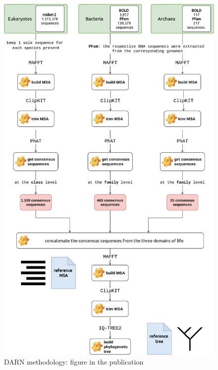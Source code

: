 \begin{figure}[!htbp]
   \centering
   \includegraphics[width=0.75\columnwidth]{figures/darn_methodology.jpg}
   \caption{DARN methodology: figure in the publication}
\end{figure}

